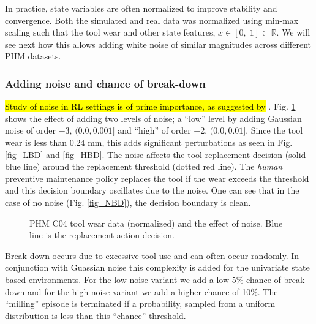 \documentclass[referee, sn-mathphys-num]{sn-jnl}
\newcommand{\hlc}[2][cyan!15]{{\colorlet{foo}{#1}\sethlcolor{foo}\hl{#2}}}
\begin{document}
	
	
	In practice, state variables are often normalized to improve stability and convergence. Both the simulated and real data was normalized using min-max scaling such that the tool wear and other state features, $x \in [0,\;1] \subset \mathbb{R} $. We will see next how this allows adding white noise of similar magnitudes across different PHM datasets.
	
	\subsubsection*{Adding noise and chance of break-down}
	\hlc{Study of noise in RL settings is of prime importance, as suggested by} \cite{Eimer2023AutoRL}. Fig. \ref{fig_noise} shows the effect of adding two levels of noise; a ``low'' level by adding Gaussian noise of order $-3$, $(0.0, 0.001]$ and ``high'' of order $-2$, $(0.0, 0.01]$. Since the tool wear is less than 0.24 mm, this adds significant perturbations as seen in Fig. \ref{fig_LBD} and \ref{fig_HBD}. The noise affects the tool replacement decision (solid blue line) around the replacement threshold (dotted red line). The \textit{human} preventive maintenance policy replaces the tool if the wear exceeds the threshold and this decision boundary oscillates due to the noise. One can see that in the case of no noise (Fig. \ref{fig_NBD}), the decision boundary is clean.
	
	\begin{figure}
		\centering	
		\caption{PHM C04 tool wear data (normalized) and the effect of noise. Blue line is the replacement action decision.}
		\label{fig_noise}
	\end{figure}
	
	Break down occurs due to excessive tool use and can often occur randomly. In conjunction with Guassian noise this complexity is added for the univariate state based environments. For the low-noise variant we add a low 5\% chance of break down and for the high noise variant we add a higher chance of 10\%. The ``milling'' episode is terminated if a probability, sampled from a uniform distribution is less than this ``chance'' threshold.
	
\end{document}
